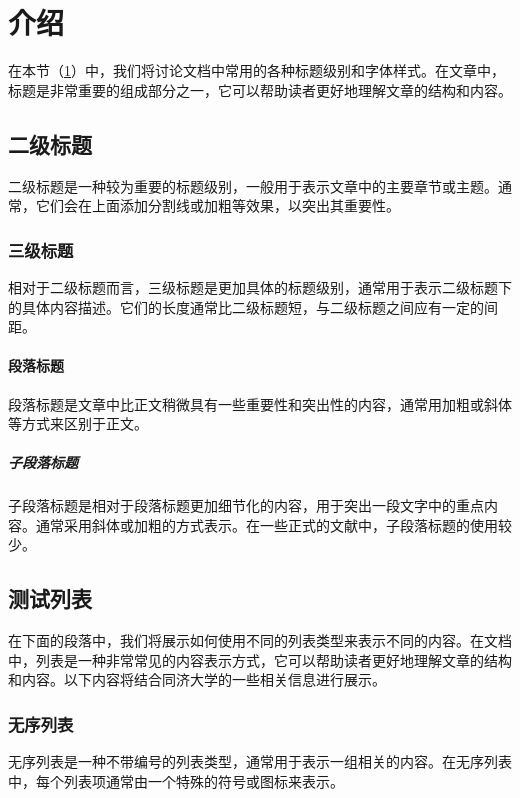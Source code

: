 \section{介绍}\label{sec:introduction}

在本节（\cref{sec:introduction}）中，我们将讨论文档中常用的各种标题级别和字体样式。在文章中，标题是非常重要的组成部分之一，它可以帮助读者更好地理解文章的结构和内容。

\subsection{二级标题}

二级标题是一种较为重要的标题级别，一般用于表示文章中的主要章节或主题。通常，它们会在上面添加分割线或加粗等效果，以突出其重要性。

\subsubsection{三级标题}

相对于二级标题而言，三级标题是更加具体的标题级别，通常用于表示二级标题下的具体内容描述。它们的长度通常比二级标题短，与二级标题之间应有一定的间距。

\paragraph{段落标题}

段落标题是文章中比正文稍微具有一些重要性和突出性的内容，通常用加粗或斜体等方式来区别于正文。

\subparagraph{子段落标题}

子段落标题是相对于段落标题更加细节化的内容，用于突出一段文字中的重点内容。通常采用斜体或加粗的方式表示。在一些正式的文献中，子段落标题的使用较少。

\subsection{测试列表}

在下面的段落中，我们将展示如何使用不同的列表类型来表示不同的内容。在文档中，列表是一种非常常见的内容表示方式，它可以帮助读者更好地理解文章的结构和内容。以下内容将结合同济大学的一些相关信息进行展示。

\subsubsection{无序列表}

无序列表是一种不带编号的列表类型，通常用于表示一组相关的内容。在无序列表中，每个列表项通常由一个特殊的符号或图标来表示。

